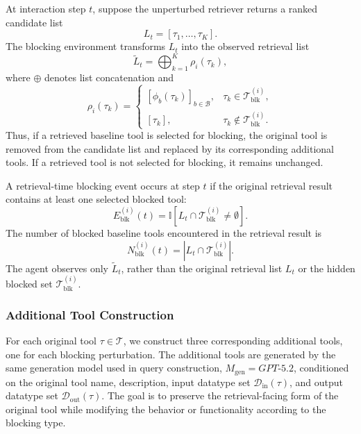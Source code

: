 \documentclass{llmxive}
\begin{document}
At interaction step $t$, suppose the unperturbed retriever returns a ranked candidate list
\begin{equation}
L_t = [\tau_1,\ldots,\tau_K].
\end{equation}
The blocking environment transforms $L_t$ into the observed retrieval list
\begin{equation}
\widetilde{L}_t
=
\bigoplus_{k=1}^{K} \rho_i(\tau_k),
\end{equation}
where $\oplus$ denotes list concatenation and
\begin{equation}
\rho_i(\tau_k)
=
\begin{cases}
[\phi_b(\tau_k)]_{b\in\mathcal{B}}, 
& \tau_k \in \mathcal{T}^{(i)}_{\mathrm{blk}},\\
[\tau_k], 
& \tau_k \notin \mathcal{T}^{(i)}_{\mathrm{blk}}.
\end{cases}
\end{equation}
Thus, if a retrieved baseline tool is selected for blocking, the original tool is removed from the candidate list and replaced by its corresponding additional tools. 
If a retrieved tool is not selected for blocking, it remains unchanged.

A retrieval-time blocking event occurs at step $t$ if the original retrieval result contains at least one selected blocked tool:
\begin{equation}
E^{(i)}_{\mathrm{blk}}(t)
=
\mathbb{I}
\left[
L_t \cap \mathcal{T}^{(i)}_{\mathrm{blk}}
\neq \emptyset
\right].
\end{equation}
The number of blocked baseline tools encountered in the retrieval result is
\begin{equation}
N^{(i)}_{\mathrm{blk}}(t)
=
\left|
L_t \cap \mathcal{T}^{(i)}_{\mathrm{blk}}
\right|.
\end{equation}
The agent observes only $\widetilde{L}_t$, rather than the original retrieval list $L_t$ or the hidden blocked set $\mathcal{T}^{(i)}_{\mathrm{blk}}$.

\subsubsection{Additional Tool Construction}
\label{app:noisy-tool-construction}


For each original tool $\tau \in \mathcal{T}$, we construct three corresponding additional tools, one for each blocking perturbation.
The additional tools are generated by the same generation model used in query construction, $M_{\mathrm{gen}}=\textit{GPT-5.2}$, conditioned on the original tool name, description, input datatype set 
$\mathcal{D}_{\mathrm{in}}(\tau)$, and output datatype set 
$\mathcal{D}_{\mathrm{out}}(\tau)$.
The goal is to preserve the retrieval-facing form of the original tool while modifying the behavior or functionality according to the blocking type.
\end{document}

